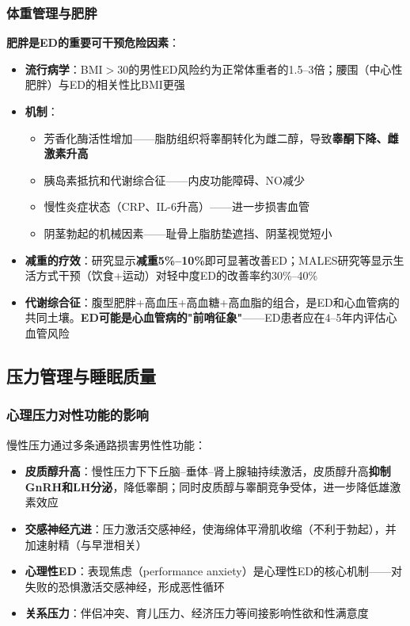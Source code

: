 \begin{enumerate}
\subsubsection{体重管理与肥胖}

\textbf{肥胖是ED的重要可干预危险因素}：

\begin{itemize}[leftmargin=2cm]
	\item \textbf{流行病学}：BMI$>$30的男性ED风险约为正常体重者的1.5--3倍；腰围（中心性肥胖）与ED的相关性比BMI更强
	\item \textbf{机制}：
    \begin{itemize}
    	\item 芳香化酶活性增加——脂肪组织将睾酮转化为雌二醇，导致\textbf{睾酮下降、雌激素升高}
    	\item 胰岛素抵抗和代谢综合征——内皮功能障碍、NO减少
    	\item 慢性炎症状态（CRP、IL-6升高）——进一步损害血管
    	\item 阴茎勃起的机械因素——耻骨上脂肪垫遮挡、阴茎视觉短小
    \end{itemize}
	\item \textbf{减重的疗效}：研究显示\textbf{减重5\%--10\%}即可显著改善ED；MALES研究等显示生活方式干预（饮食+运动）对轻中度ED的改善率约30\%--40\%
	\item \textbf{代谢综合征}：腹型肥胖+高血压+高血糖+高血脂的组合，是ED和心血管病的共同土壤。\textbf{ED可能是心血管病的"前哨征象"}——ED患者应在4--5年内评估心血管风险
\end{itemize}

\subsection{压力管理与睡眠质量}

\subsubsection{心理压力对性功能的影响}

慢性压力通过多条通路损害男性性功能：

\begin{itemize}[leftmargin=2cm]
	\item \textbf{皮质醇升高}：慢性压力下下丘脑--垂体--肾上腺轴持续激活，皮质醇升高\textbf{抑制GnRH和LH分泌}，降低睾酮；同时皮质醇与睾酮竞争受体，进一步降低雄激素效应
	\item \textbf{交感神经亢进}：压力激活交感神经，使海绵体平滑肌收缩（不利于勃起），并加速射精（与早泄相关）
	\item \textbf{心理性ED}：表现焦虑（performance anxiety）是心理性ED的核心机制——对失败的恐惧激活交感神经，形成恶性循环
	\item \textbf{关系压力}：伴侣冲突、育儿压力、经济压力等间接影响性欲和性满意度
\end{itemize}


\end{enumerate}
